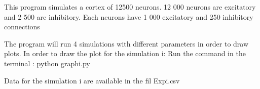 This program simulates a cortex of 12500 neurons. 12 000 neurons are excitatory and 2 500 are inhibitory. Each neurons have 1 000 excitatory and 250 inhibitory connections

The program will run 4 simulations with different parameters in order to draw plots. In order to draw the plot for the simulation i\+: Run the command in the terminal \+: python graphi.\+py

Data for the simulation i are available in the fil Expi.\+csv 